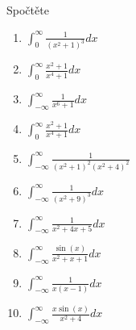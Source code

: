 \begin{multicols}{2}
\separator

Spočtěte
\begin{enumerate}
\item $\int_0^\infty \frac{1}{(x^2 + 1)^3} dx$
\item $\int_0^\infty \frac{x^2 + 1}{x^4 + 1} dx$
\item $\int_{-\infty}^\infty \frac{1}{x^6 + 1} dx$
\item $\int_0^\infty \frac{x^2 + 1}{x^4 + 1} dx$
\item $\int_{-\infty}^\infty \frac{1}{\left( x^2 + 1 \right)^2 \left( x^2 + 4 \right)^2}$
\item $\int_{-\infty}^\infty \frac{1}{(x^2 + 9)^3} dx$
\item $\int_{-\infty}^\infty \frac{1}{x^2 + 4x + 5} dx$
\item $\int_{-\infty}^\infty \frac{\sin (x)}{x^2 + x + 1} dx$
\item $\int_{-\infty}^\infty \frac{1}{x(x-1)} dx$
\item $\int_{-\infty}^\infty \frac{x \sin (x)}{x^2 + 4} dx$
\end{enumerate}

\end{multicols}
